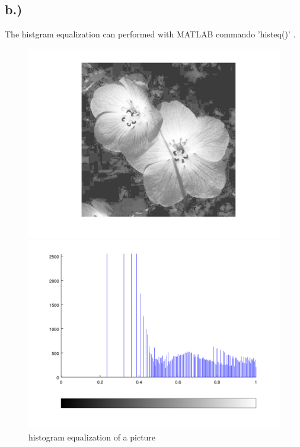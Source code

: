 \documentclass{scrartcl}
\begin{document}
\subsection*{b.)}
The histgram equalization can performed with MATLAB commando 'histeq()' .

%

\begin{figure}[htp!]
	\begin{minipage}[t]{0.5\textwidth}
		\includegraphics[width=\textwidth]{flower_eq.png}
	\end{minipage}
	\begin{minipage}[t]{0.5\textwidth}
		\includegraphics[width=\textwidth]{histoeq_flower.png}
	\end{minipage}
	\caption{histogram equalization of a picture}
	\label{pic:histoeq_pic}
\end{figure}
\end{document}
